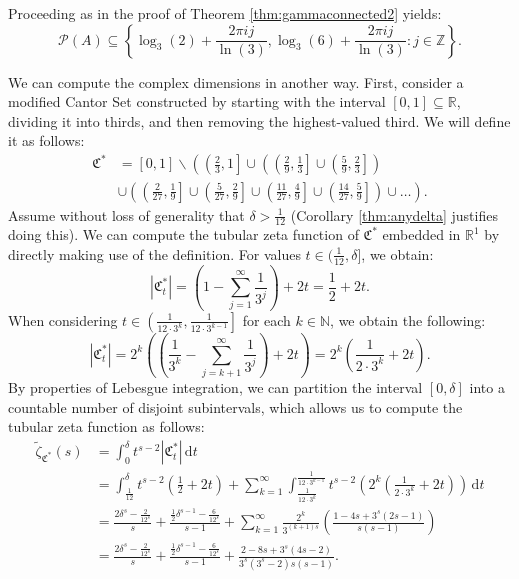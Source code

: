 \documentclass{article}
\theoremstyle{plain}
\numberwithin{equation}{section}
\numberwithin{table}{section}
\numberwithin{figure}{section}
\begin{document}
Proceeding as in the proof of Theorem \ref{thm:gammaconnected2} yields:
\begin{equation}
\mathscr{P}(A) \subseteq \left\{\log_3(2) + \frac{2\pi i j}{\ln(3)}, \log_3(6) + \frac{2\pi i j}{\ln(3)} : j \in \mathbb{Z}\right\}.
\end{equation}


We can compute the complex dimensions in another way. First, consider a modified Cantor Set constructed by starting with the interval $[0,1] \subseteq \mathbb{R}$, dividing it into thirds, and then removing the highest-valued third. We will define it as follows:
\begin{align}
\mathfrak{C}^* &= [0,1] \backslash \left(\left(\frac{2}{3},1\right] \cup
\left(\left(\frac{2}{9},\frac{1}{3}\right] \cup \left(\frac{5}{9},\frac{2}{3}\right]\right)\right.\nonumber\\&\left. \cup
\left(\left(\frac{2}{27},\frac{1}{9}\right] \cup \left(\frac{5}{27},\frac{2}{9}\right] \cup \left(\frac{11}{27},\frac{4}{9}\right] \cup \left(\frac{14}{27},\frac{5}{9}\right]\right) \cup\dots\right).
\end{align}
Assume without loss of generality that $\delta > \frac{1}{12}$ (Corollary \ref{thm:anydelta} justifies doing this). We can compute the tubular zeta function of $\mathfrak{C}^*$ embedded in $\mathbb{R}^1$ by directly making use of the definition. For values $t \in (\frac{1}{12},\delta]$, we obtain:
\begin{equation}
|\mathfrak{C}_t^*| = \left(1 - \sum_{j=1}^{\infty} \frac{1}{3^j}\right) + 2t = \frac{1}{2} + 2t.
\end{equation}
When considering $t \in \left(\frac{1}{12\cdot3^k}, \frac{1}{12\cdot3^{k-1}}\right]$ for each $k \in \mathbb{N}$, we obtain the following:
\begin{equation}
|\mathfrak{C}_t^*| = 2^k \left(\left(\frac{1}{3^k} - \sum_{j=k+1}^{\infty} \frac{1}{3^j}\right) + 2t\right) = 2^k \left(\frac{1}{2\cdot3^k} + 2t\right).
\end{equation}
By properties of Lebesgue integration, we can partition the interval $[0,\delta]$ into a countable number of disjoint subintervals, which allows us to compute the tubular zeta function as follows:
\begin{align}
\tilde{\zeta}_{\mathfrak{C}^*}(s) &= \int_0^{\delta} t^{s-2} |\mathfrak{C}_t^*| \,\mathrm{d}t \\
&= \int_{\frac{1}{12}}^{\delta} t^{s-2} \left(\frac{1}{2} + 2t\right) + \sum_{k=1}^{\infty} \int_{\frac{1}{12\cdot3^k}}^{\frac{1}{12\cdot3^{k-1}}} t^{s-2} \left(2^k \left(\frac{1}{2\cdot3^k} + 2t\right)\right) \,\mathrm{d}t \\
&= \frac{2\delta^s - \frac{2}{12^s}}{s} + \frac{\frac{1}{2}\delta^{s-1} - \frac{6}{12^s}}{s-1}
+ \sum_{k=1}^{\infty} \frac{2^k}{3^{(k+1)s}} \left(\frac{1 - 4s + 3^s (2s-1)}{s(s-1)}\right) \\
&= \frac{2\delta^s - \frac{2}{12^s}}{s} + \frac{\frac{1}{2}\delta^{s-1} - \frac{6}{12^s}}{s-1}
+ \frac{2 - 8s + 3^s (4s-2)}{3^s (3^s-2) s(s-1)}. \label{eq:onedzeta}
\end{align}
\end{document}
